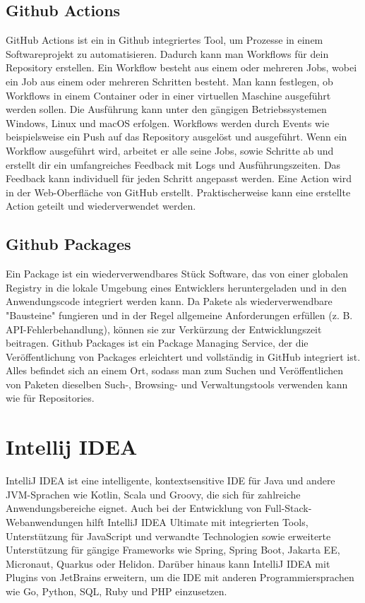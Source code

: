 \subsection{Github Actions}

GitHub Actions ist ein in Github integriertes Tool, um Prozesse in einem Softwareprojekt zu automatisieren. 
Dadurch kann man Workflows für dein Repository erstellen. Ein Workflow besteht aus einem oder mehreren Jobs, 
wobei ein Job aus einem oder mehreren Schritten besteht. Man kann festlegen, ob Workflows in einem Container oder in einer virtuellen 
Maschine ausgeführt werden sollen. Die Ausführung kann unter den gängigen Betriebssystemen Windows, Linux und macOS erfolgen. 
Workflows werden durch Events wie beispielsweise ein Push auf das Repository ausgelöst und ausgeführt. Wenn ein Workflow ausgeführt wird, 
arbeitet er alle seine Jobs, sowie Schritte ab und erstellt dir ein umfangreiches Feedback mit Logs und Ausführungszeiten. 
Das Feedback kann individuell für jeden Schritt angepasst werden. Eine Action wird in der Web-Oberfläche von GitHub erstellt. 
Praktischerweise kann eine erstellte Action geteilt und wiederverwendet werden.
\cite{sysarch-github-4}

\subsection{Github Packages}

Ein Package ist ein wiederverwendbares Stück Software, das von einer globalen Registry in die lokale Umgebung eines Entwicklers heruntergeladen und 
in den Anwendungscode integriert werden kann. Da Pakete als wiederverwendbare "Bausteine" fungieren und in der Regel allgemeine Anforderungen erfüllen 
(z. B. API-Fehlerbehandlung), können sie zur Verkürzung der Entwicklungszeit beitragen. Github Packages ist ein Package Managing Service, 
der die Veröffentlichung von Packages erleichtert und vollständig in GitHub integriert ist. Alles befindet sich an einem Ort, 
sodass man zum Suchen und Veröffentlichen von Paketen dieselben Such-, Browsing- und Verwaltungstools verwenden kann wie für Repositories.
\cite{sysarch-github-5}

\section{Intellij IDEA}

IntelliJ IDEA ist eine intelligente, kontextsensitive IDE für Java und andere JVM-Sprachen wie Kotlin, Scala und Groovy, die sich für zahlreiche 
Anwendungsbereiche eignet. Auch bei der Entwicklung von Full-Stack-Webanwendungen hilft IntelliJ IDEA Ultimate mit integrierten Tools, 
Unterstützung für JavaScript und verwandte Technologien sowie erweiterte Unterstützung für gängige Frameworks wie Spring, Spring Boot, Jakarta EE, Micronaut, 
Quarkus oder Helidon. Darüber hinaus kann IntelliJ IDEA mit Plugins von JetBrains erweitern, um die IDE mit anderen Programmiersprachen wie 
Go, Python, SQL, Ruby und PHP einzusetzen. 
\cite{sysarch-intellij-1}

